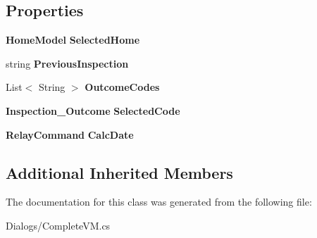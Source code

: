 \subsection*{Properties}
\begin{DoxyCompactItemize}
\item 
\mbox{\label{class_a_f_h___scheduler_1_1_dialogs_1_1_complete_v_m_a2e7b60206321cb93108a8da5feeee79c}} 
\textbf{ Home\+Model} {\bfseries Selected\+Home}\hspace{0.3cm}{\ttfamily  [get, set]}
\item 
\mbox{\label{class_a_f_h___scheduler_1_1_dialogs_1_1_complete_v_m_ad78284b8eaded8c0ffe61747fac58739}} 
string {\bfseries Previous\+Inspection}\hspace{0.3cm}{\ttfamily  [get, set]}
\item 
\mbox{\label{class_a_f_h___scheduler_1_1_dialogs_1_1_complete_v_m_aa0b2ba774d1054d4f549c87ed2dd0e73}} 
List$<$ String $>$ {\bfseries Outcome\+Codes}\hspace{0.3cm}{\ttfamily  [get, set]}
\item 
\mbox{\label{class_a_f_h___scheduler_1_1_dialogs_1_1_complete_v_m_a940a536c5b3c595fbeb6ff07ae0c74ba}} 
\textbf{ Inspection\+\_\+\+Outcome} {\bfseries Selected\+Code}\hspace{0.3cm}{\ttfamily  [get, set]}
\item 
\mbox{\label{class_a_f_h___scheduler_1_1_dialogs_1_1_complete_v_m_ad124993d93bf0b80692d316178b58901}} 
\textbf{ Relay\+Command} {\bfseries Calc\+Date}\hspace{0.3cm}{\ttfamily  [get]}
\end{DoxyCompactItemize}
\subsection*{Additional Inherited Members}


The documentation for this class was generated from the following file\+:\begin{DoxyCompactItemize}
\item 
Dialogs/Complete\+V\+M.\+cs\end{DoxyCompactItemize}
